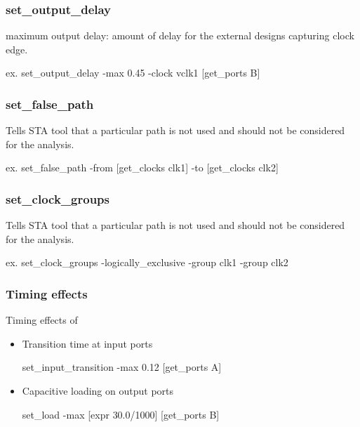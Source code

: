 \subsubsection{set\_output\_delay}
maximum output delay: amount of delay for the external designs capturing clock edge.\\
\centerline{ex. set\_output\_delay -max 0.45 -clock vclk1 [get\_ports B]}

\subsubsection{set\_false\_path}
Tells STA tool that a particular path is not used and should not be considered for the analysis.\\
\centerline{ex. set\_false\_path -from [get\_clocks clk1] -to [get\_clocks clk2]} 

\subsubsection{set\_clock\_groups}
Tells STA tool that a particular path is not used and should not be considered for the analysis.\\
\centerline{ex. set\_clock\_groups -logically\_exclusive -group clk1 -group clk2}





\subsubsection{Timing effects}
Timing effects of 
\begin{itemize}
    \item Transition time at input ports\\
    \centerline{set\_input\_transition -max 0.12 [get\_ports A]}
    \item Capacitive loading on output ports\\
    \centerline{set\_load -max  [expr {30.0/1000}] [get\_ports B]}
\end{itemize}
